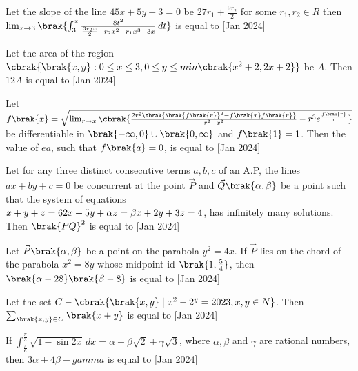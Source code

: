 \iffalse
\title{January 2024, shift 2}
\author{EE24BTECH11062}	
\section{integer}
\fi
\item Let the slope of the line $45x+5y+3=0$ be $27r_1+\frac{9r_2}{2}$ for some $r_1,r_2\in R$ then $\lim_{x \to 3}\brak{ \int_{3}^{x} \frac{8t^2}{\frac{3r_2x}{2}-r_2x^2-r_1x^3-3x} \, dt}$ is equal to \hfill{[Jan 2024]}

\item Let the area of the region $\cbrak{\brak{x,y}:0\leq x \leq 3, 0\leq y\leq min\cbrak{x^2+2,2x+2}}$ be $A$. Then $12A$ is equal to \hfill{[Jan 2024]}

\item Let $f\brak{x}=\sqrt{\lim_{r \to x}\cbrak{\frac{2r^2\sbrak{\brak{f\brak{r}}^2-f\brak{x}f\brak{r}}}{r^2-x^2}-r^3e^{\frac{f\brak{r}}{r}}}}$ be differentiable in $\brak{-\infty,0}\cup\brak{0,\infty}$ and $f\brak{1}=1$. Then the value of $ea$, such that $f\brak{a}=0$, is equal to \hfill{[Jan 2024]}

\item Let for any three distinct consecutive terms $a,b,c$ of an A.P, the lines $ax+by+c=0$ be concurrent at the point $\vec{P}$ and $\vec{Q}\brak{\alpha,\beta}$ be a point such that the system of equations \\
$x+y+z=6\\
2x+5y+\alpha z=\beta\\
x+2y+3z=4$, has infinitely many solutions. Then $\brak{PQ}^2$ is equal to \hfill{[Jan 2024]}

\item Let $\vec{P}\brak{\alpha,\beta}$ be a point on the parabola $y^2=4x$. If $\vec{P}$ lies on the chord of the parabola $x^2=8y$ whose midpoint id $\brak{1,\frac{5}{4}}$, then $\brak{\alpha-28}\brak{\beta-8}$ is equal to \hfill{[Jan 2024]}

\item Let the set $C-\cbrak{\brak{x,y}\mid x^2-2^y=2023,x,y\in N}$. Then $\sum_{\brak{x,y}\in C}\brak{x+y}$ is equal to \hfill{[Jan 2024]}

\item If $\int_{\frac{\pi}{6}}^{\frac{\pi}{3}} \sqrt{1-\sin 2x} \, dx=\alpha+\beta\sqrt{2}+\gamma\sqrt{3}$, where $\alpha,\beta$ and $\gamma$ are rational numbers, then $3\alpha+4\beta-gamma$ is equal to \hfill{[Jan 2024]}

